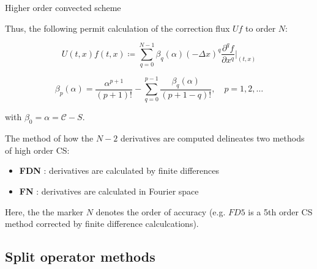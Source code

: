 \documentclass{beamer}
\begin{document}
\begin{frame}{Higher order convected scheme}

Thus, the following permit calculation of the correction flux $Uf$ to order $N$:

$$U(t,x)f(t,x) \coloneqq \sum_{q = 0}^{N-1} \beta_q(\alpha )(-\Delta x)^q\frac{\partial^q f}{\partial x^q}\biggr|_{(t,x)}$$

$$\beta_p(\alpha ) = \frac{\alpha^{p+1}}{(p+1)!} - \sum_{q = 0}^{p - 1}\frac{\beta_q(\alpha )}{(p + 1 - q)!}, \quad p = 1,2,\ldots $$

with $\beta_0 = \alpha = \mathcal{C} - S$.

The method of how the $N - 2$ derivatives are computed delineates two methods of high order CS:

\begin{itemize}
\item \textbf{FDN} : derivatives are calculated by finite differences
\item \textbf{FN}\phantom{D}  : derivatives are calculated in Fourier space
\end{itemize}

Here, the the marker $N$ denotes the order of accuracy (e.g. $FD5$ is a 5th order CS method corrected by finite difference calculcations).

\end{frame}
 



\subsection{Split operator methods}

\end{document}
